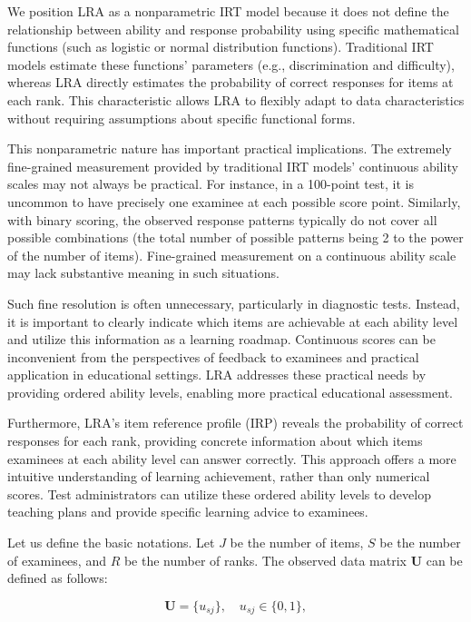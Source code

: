 We position LRA as a nonparametric IRT model because it does not define the relationship between ability and response probability using specific mathematical functions (such as logistic or normal distribution functions). Traditional IRT models estimate these functions' parameters (e.g., discrimination and difficulty), whereas LRA directly estimates the probability of correct responses for items at each rank. This characteristic allows LRA to flexibly adapt to data characteristics without requiring assumptions about specific functional forms.

This nonparametric nature has important practical implications. The extremely fine-grained measurement provided by traditional IRT models' continuous ability scales may not always be practical. For instance, in a 100-point test, it is uncommon to have precisely one examinee at each possible score point. Similarly, with binary scoring, the observed response patterns typically do not cover all possible combinations (the total number of possible patterns being 2 to the power of the number of items). Fine-grained measurement on a continuous ability scale may lack substantive meaning in such situations.

Such fine resolution is often unnecessary, particularly in diagnostic tests. Instead, it is important to clearly indicate which items are achievable at each ability level and utilize this information as a learning roadmap. Continuous scores can be inconvenient from the perspectives of feedback to examinees and practical application in educational settings. LRA addresses these practical needs by providing ordered ability levels, enabling more practical educational assessment.

Furthermore, LRA's item reference profile (IRP) reveals the probability of correct responses for each rank, providing concrete information about which items examinees at each ability level can answer correctly. This approach offers a more intuitive understanding of learning achievement, rather than only numerical scores. Test administrators can utilize these ordered ability levels to develop teaching plans and provide specific learning advice to examinees.

Let us define the basic notations. Let \(J\) be the number of items, \(S\) be the number of examinees, and \(R\) be the number of ranks. The observed data matrix \(\mathbf{U}\) can be defined as follows:

\[
\mathbf{U} = \{u_{sj}\}, \quad u_{sj} \in \{0,1\},
\]

